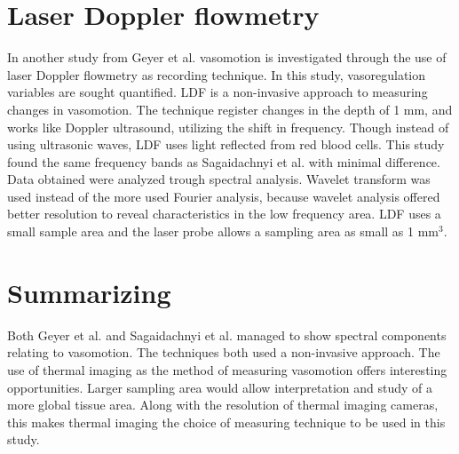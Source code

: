 \section{Laser Doppler flowmetry}
In another study from Geyer et al. vasomotion is investigated through the use of laser Doppler flowmetry as recording technique. In this study, vasoregulation variables are sought quantified. LDF is a non-invasive approach to measuring changes in vasomotion. The technique register changes in the depth of 1 mm, and works like Doppler ultrasound, utilizing the shift in frequency. Though instead of using ultrasonic waves, LDF uses light reflected from red blood cells. This study found the same frequency bands as Sagaidachnyi et al. with minimal difference. Data obtained were analyzed trough spectral analysis. Wavelet transform was used instead of the more used Fourier analysis, because wavelet analysis offered better resolution to reveal characteristics in the low frequency area.\cite{geyer2004}
LDF uses a small sample area and the laser probe allows a sampling area as small as 1 mm$^3$.\cite{brothers2010} 


  
\section{Summarizing}

Both Geyer et al. and Sagaidachnyi et al. managed to show spectral components relating to vasomotion. The techniques both used a non-invasive approach. The use of thermal imaging as the method of measuring vasomotion offers interesting opportunities. Larger sampling area would allow interpretation and study of a more global tissue area. Along with the resolution of thermal imaging cameras, this makes thermal imaging the choice of measuring technique to be used in this study. 



